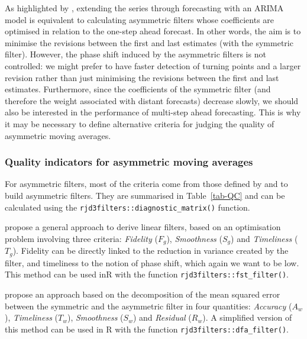 \documentclass[
]{article}
\newcommand\1{\mathds{1}}
\begin{document}
As highlighted by \textcite{wildischis2004}, extending the series
through forecasting with an ARIMA model is equivalent to calculating
asymmetric filters whose coefficients are optimised in relation to the
one-step ahead forecast. In other words, the aim is to minimise the
revisions between the first and last estimates (with the symmetric
filter). However, the phase shift induced by the asymmetric filters is
not controlled: we might prefer to have faster detection of turning
points and a larger revision rather than just minimising the revisions
between the first and last estimates. Furthermore, since the
coefficients of the symmetric filter (and therefore the weight
associated with distant forecasts) decrease slowly, we should also be
interested in the performance of multi-step ahead forecasting. This is
why it may be necessary to define alternative criteria for judging the
quality of asymmetric moving averages.

\subsubsection{Quality indicators for asymmetric moving
averages}\label{subsec:crit-qual}

For asymmetric filters, most of the criteria come from those defined by
\textcite{ch15HBSA} and \textcite{trilemmaWMR2019} to build asymmetric
filters. They are summarised in Table~\ref{tab-QC} and can be calculated
using the \texttt{rjd3filters::diagnostic\_matrix()} function.

\textcite{ch15HBSA} propose a general approach to derive linear filters,
based on an optimisation problem involving three criteria:
\emph{Fidelity} (\(F_g\)), \emph{Smoothness} (\(S_g\)) and
\emph{Timeliness} (\(T_g\)). Fidelity can be directly linked to the
reduction in variance created by the filter, and timeliness to the
notion of phase shift, which again we want to be low. This method can be
used inR with the function \texttt{rjd3filters::fst\_filter()}.

\textcite{trilemmaWMR2019} propose an approach based on the
decomposition of the mean squared error between the symmetric and the
asymmetric filter in four quantities: \emph{Accuracy} (\(A_w\)),
\emph{Timeliness} (\(T_w\)), \emph{Smoothness} (\(S_w\)) and
\emph{Residual} (\(R_w\)). A simplified version of this method can be
used in R with the function \texttt{rjd3filters::dfa\_filter()}.
\end{document}

